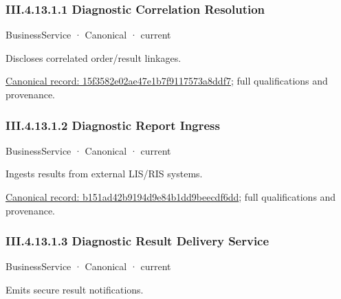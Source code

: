 \subsubsection*{III.4.13.1.1 Diagnostic Correlation Resolution}
\label{navigation:III.4.13.1.1}

\label{element:15f3582e02ae47e1b7f9117573a8ddf7}
{\small BusinessService · Canonical · current}\par

Discloses correlated order/result linkages.


{\footnotesize \href{../../../../continuum/business/business-service/15f3582e02ae47e1b7f9117573a8ddf7.md}{Canonical record: 15f3582e02ae47e1b7f9117573a8ddf7}; full qualifications and provenance.}\par
\subsubsection*{III.4.13.1.2 Diagnostic Report Ingress}
\label{navigation:III.4.13.1.2}

\label{element:b151ad42b9194d9e84b1dd9beecdf6dd}
{\small BusinessService · Canonical · current}\par

Ingests results from external LIS/RIS systems.


{\footnotesize \href{../../../../continuum/business/business-service/b151ad42b9194d9e84b1dd9beecdf6dd.md}{Canonical record: b151ad42b9194d9e84b1dd9beecdf6dd}; full qualifications and provenance.}\par
\subsubsection*{III.4.13.1.3 Diagnostic Result Delivery Service}
\label{navigation:III.4.13.1.3}

\label{element:86a9d1868c8c45788791a9436794531c}
{\small BusinessService · Canonical · current}\par

Emits secure result notifications.


